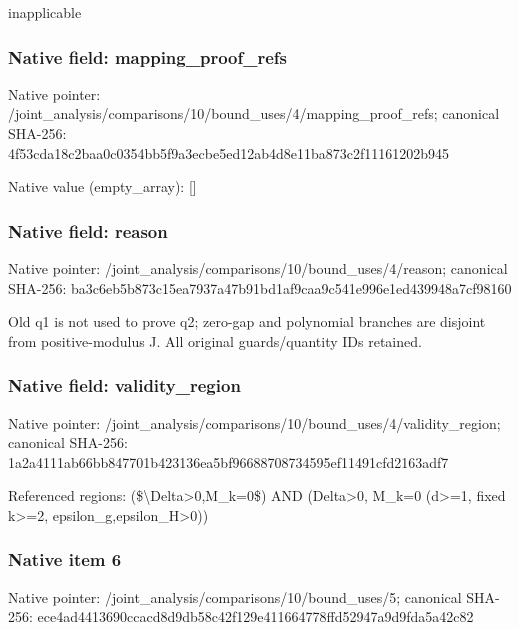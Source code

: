 \documentclass[10pt,a4paper]{article}
\begin{document}
\begingroup\raggedright\sloppy inapplicable\par\endgroup

\subsubsection{Native field: mapping\_\allowbreak{}proof\_\allowbreak{}refs}
Native pointer: /joint\_\allowbreak{}analysis/comparisons/10/bound\_\allowbreak{}uses/4/mapping\_\allowbreak{}proof\_\allowbreak{}refs; canonical SHA-256: 4f53cda18c2baa0c0354bb5f9a3ecbe5ed12ab4d8e11ba873c2f11161202b945

Native value (empty\_\allowbreak{}array): []

\subsubsection{Native field: reason}
Native pointer: /joint\_\allowbreak{}analysis/comparisons/10/bound\_\allowbreak{}uses/4/reason; canonical SHA-256: ba3c6eb5b873c15ea7937a47b91bd1af9caa9c541e996e1ed439948a7cf98160

\begingroup\raggedright\sloppy Old q1 is not used to prove q2;\allowbreak{} zero-gap and polynomial branches are disjoint from positive-modulus J. All original guards/\allowbreak{}quantity IDs retained.\par\endgroup

\subsubsection{Native field: validity\_\allowbreak{}region}
Native pointer: /joint\_\allowbreak{}analysis/comparisons/10/bound\_\allowbreak{}uses/4/validity\_\allowbreak{}region; canonical SHA-256: 1a2a4111ab66bb847701b423136ea5bf96688708734595ef11491cfd2163adf7

\begingroup\raggedright\sloppy Referenced regions:\allowbreak{} (\$\textbackslash{}Delta>0,\allowbreak{}M\_\allowbreak{}k=\allowbreak{}0\$) AND (Delta>0,\allowbreak{} M\_\allowbreak{}k=\allowbreak{}0 (d>=\allowbreak{}1,\allowbreak{} fixed k>=\allowbreak{}2,\allowbreak{} epsilon\_\allowbreak{}g,\allowbreak{}epsilon\_\allowbreak{}H>0))\par\endgroup

\subsubsection{Native item 6}
Native pointer: /joint\_\allowbreak{}analysis/comparisons/10/bound\_\allowbreak{}uses/5; canonical SHA-256: ece4ad4413690ccacd8d9db58c42f129e411664778ffd52947a9d9fda5a42c82
\end{document}
